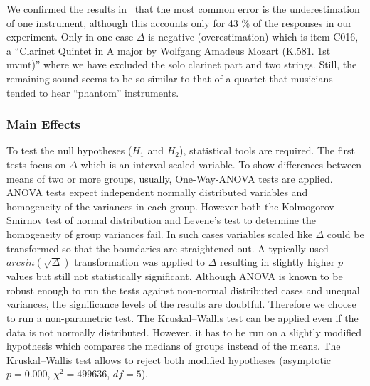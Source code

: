 We confirmed the results in~\cite{huron89} that the most common error is the underestimation of one instrument, although this accounts only for 43 \% of the responses in our experiment. Only in one case $\Delta$ is negative (overestimation) which is item C016, a ``Clarinet Quintet in A major by Wolfgang Amadeus Mozart (K.581. 1st mvmt)'' where we have excluded the solo clarinet part and two strings. Still, the remaining sound seems to be so similar to that of a quartet that musicians tended to hear ``phantom'' instruments.

\subsubsection*{Main Effects}

To test the null hypotheses ($H_1$ and $H_2$), statistical tools are required.
The first tests focus on $\Delta$ which is an interval-scaled variable. To show differences between means of two or more groups, usually, One-Way-ANOVA tests are applied. ANOVA tests expect independent normally distributed variables and homogeneity of the variances in each group. However both the Kolmogorov--Smirnov test of normal distribution and Levene's test to determine the homogeneity of group variances fail. In such cases variables scaled like $\Delta$ could be transformed so that the boundaries are straightened out. A typically used $arcsin(\sqrt{\Delta})$ transformation was applied to $\Delta$ resulting in slightly higher $p$ values but still not statistically significant. Although ANOVA is known to be robust enough to run the tests against non-normal distributed cases and unequal variances, the significance levels of the results are doubtful. Therefore we choose to run a non-parametric test. The Kruskal--Wallis test can be applied even if the data is not normally distributed. However, it has to be run on a slightly modified hypothesis which compares the medians of groups instead of the means. The Kruskal--Wallis test allows to reject both modified hypotheses (asymptotic $p = 0.000$, $\chi^2 = 499636$, $df=5$).
